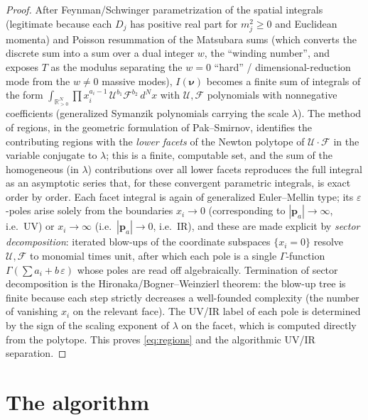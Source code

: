 \documentclass{amsart}
\theoremstyle{definition}
\begin{document}
\begin{proof}
After Feynman/Schwinger parametrization of the spatial integrals (legitimate
because each $D_j$ has positive real part for $m_j^2\ge0$ and Euclidean
momenta) and Poisson resummation of the Matsubara sums (which converts the
discrete sum into a sum over a dual integer $w$, the ``winding number'', and
exposes $T$ as the modulus separating the $w=0$ ``hard'' / dimensional-reduction
mode from the $w\neq0$ massive modes), $I(\boldsymbol\nu)$ becomes a finite
sum of integrals of the form
$\int_{\mathbb R_{>0}^N}\prod x_i^{a_i-1}\,
\mathcal U^{b_1}\mathcal F^{b_2}\,d^N x$
with $\mathcal U,\mathcal F$ polynomials with nonnegative coefficients
(generalized Symanzik polynomials carrying the scale $\lambda$). The method of
regions, in the geometric formulation of Pak--Smirnov, identifies the
contributing regions with the \emph{lower facets} of the Newton polytope of
$\mathcal U\cdot\mathcal F$ in the variable conjugate to $\lambda$; this is a
finite, computable set, and the sum of the homogeneous (in $\lambda$)
contributions over all lower facets reproduces the full integral as an
asymptotic series that, for these convergent parametric integrals, is exact
order by order. Each facet integral is again of generalized Euler--Mellin type;
its $\varepsilon$-poles arise solely from the boundaries $x_i\to0$
(corresponding to $|\mathbf p_a|\to\infty$, i.e.\ UV) or $x_i\to\infty$
(i.e.\ $|\mathbf p_a|\to0$, i.e.\ IR), and these are made explicit by
\emph{sector decomposition}: iterated blow-ups of the coordinate subspaces
$\{x_i=0\}$ resolve $\mathcal U,\mathcal F$ to monomial times unit, after which
each pole is a single $\Gamma$-function $\Gamma(\sum a_i+b\,\varepsilon)$ whose
poles are read off algebraically. Termination of sector decomposition is the
Hironaka/Bogner--Weinzierl theorem: the blow-up tree is finite because each
step strictly decreases a well-founded complexity (the number of vanishing
$x_i$ on the relevant face). The UV/IR label of each pole is determined by the
sign of the scaling exponent of $\lambda$ on the facet, which is computed
directly from the polytope. This proves \eqref{eq:regions} and the algorithmic
UV/IR separation.
\end{proof}

\section{The algorithm}
\end{document}
